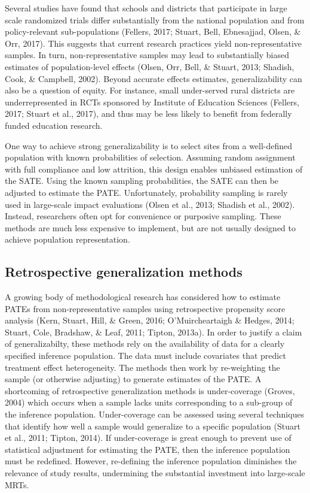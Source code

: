 \documentclass[
  english,
  man,floatsintext]{apa6}
\begin{document}
Several studies have found that schools and districts that participate in large scale randomized trials differ substantially from the national population and from policy-relevant sub-populations (Fellers, 2017; Stuart, Bell, Ebnesajjad, Olsen, \& Orr, 2017).
This suggests that current research practices yield non-representative samples.
In turn, non-representative samples may lead to substantially biased estimates of population-level effects (Olsen, Orr, Bell, \& Stuart, 2013; Shadish, Cook, \& Campbell, 2002). Beyond accurate effects estimates, generalizability can also be a question of equity. For instance, small under-served rural districts are underrepresented in RCTs sponsored by Institute of Education Sciences (Fellers, 2017; Stuart et al., 2017), and thus may be less likely to benefit from federally funded education research.

One way to achieve strong generalizability is to select sites from a well-defined population with known probabilities of selection. Assuming random assignment with full compliance and low attrition, this design enables unbiased estimation of the SATE. Using the known sampling probabilities, the SATE can then be adjusted to estimate the PATE. Unfortunately, probability sampling is rarely used in large-scale impact evaluations (Olsen et al., 2013; Shadish et al., 2002). Instead, researchers often opt for convenience or purposive sampling. These methods are much less expensive to implement, but are not usually designed to achieve population representation.

\hypertarget{retrospective-generalization-methods}{%
\subsection{Retrospective generalization methods}\label{retrospective-generalization-methods}}

A growing body of methodological research has considered how to estimate PATEs from non-representative samples using retrospective propensity score analysis (Kern, Stuart, Hill, \& Green, 2016; O'Muircheartaigh \& Hedges, 2014; Stuart, Cole, Bradshaw, \& Leaf, 2011; Tipton, 2013a).
In order to justify a claim of generalizabilty, these methods rely on the availability of data for a clearly specified inference population.
The data must include covariates that predict treatment effect heterogeneity.
The methods then work by re-weighting the sample (or otherwise adjusting) to generate estimates of the PATE.
A shortcoming of retrospective generalization methods is under-coverage (Groves, 2004) which occurs when a sample lacks units corresponding to a sub-group of the inference population. Under-coverage can be assessed using several techniques that identify how well a sample would generalize to a specific population (Stuart et al., 2011; Tipton, 2014). If under-coverage is great enough to prevent use of statistical adjustment for estimating the PATE, then the inference population must be redefined. However, re-defining the inference population diminishes the relevance of study results, undermining the substantial investment into large-scale MRTs.
\end{document}
